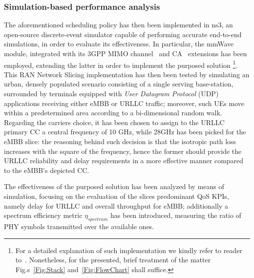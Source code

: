 \documentclass[11pt]{book}
\begin{document}
\subsubsection{Simulation-based performance analysis}
The aforementioned scheduling policy has then been implemented in ns3, an open-source discrete-event simulator capable of performing accurate end-to-end simulations, in order to evaluate its effectiveness. In particular, the mmWave~\cite{mmwave5gmodule} module, integrated with its 3GPP MIMO channel~\cite{mmwave3gppchannel} and CA~\cite{Zugno_2018} extensions has been employed, extending the latter in order to implement the purposed solution \footnote{For a detailed explanation of such implementation we kindly refer to reader to~\cite{pagin2020}. Nonetheless, for the presented, brief treatment of the matter Fig.s~\ref{Fig:Stack} and~\ref{Fig:FlowChart} shall suffice.}. This RAN Network Slicing implementation has then been tested by simulating an urban, densely populated scenario consisting of a single serving base-station, surrounded by terminals equipped with \textit{User Datagram Protocol} (UDP) applications receiving either eMBB or URLLC traffic; moreover, such UEs move within a predetermined area according to a bi-dimensional random walk. Regarding the carriers choice, it has been chosen to assign to the URLLC primary CC a central frequency of 10 GHz, while 28GHz has been picked for the eMBB slice: the reasoning behind such decision is that the isotropic path loss increases with the square of the frequency, hence the former should provide the URLLC reliability and delay requirements in a more effective manner compared to the eMBB's depicted CC.

The effectiveness of the purposed solution has been analyzed by means of simulation, focusing on the evaluation of the slices predominant QoS KPIs, namely delay for URLLC and overall throughput for eMBB; additionally a spectrum efficiency metric $\eta_{spectrum}$ has been introduced, measuring the ratio of PHY symbols transmitted over the available ones. 
\end{document}

